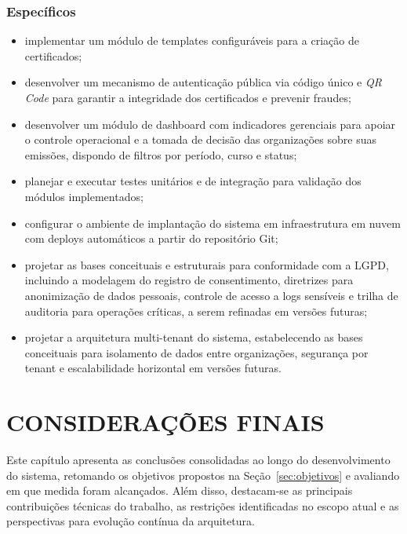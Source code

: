 \documentclass[12pt,openright,oneside,a4paper]{article}
\begin{document}
\subsubsection{Específicos}\label{sec:objetivos-especificos}

\begin{itemize}
    \item implementar um módulo de templates configuráveis para a criação de certificados;
    \item desenvolver um mecanismo de autenticação pública via código único e \textit{QR Code} para garantir a integridade dos certificados e prevenir fraudes;
    \item desenvolver um módulo de dashboard com indicadores gerenciais para apoiar o controle operacional e a tomada de decisão das organizações sobre suas emissões, dispondo de filtros por período, curso e status;
    \item planejar e executar testes unitários e de integração para validação dos módulos implementados;
    \item configurar o ambiente de implantação do sistema em infraestrutura em nuvem com deploys automáticos a partir do repositório Git;
    \item projetar as bases conceituais e estruturais para conformidade com a LGPD, incluindo a modelagem do registro de consentimento, diretrizes para anonimização de dados pessoais, controle de acesso a logs sensíveis e trilha de auditoria para operações críticas, a serem refinadas em versões futuras;
    \item projetar a arquitetura multi-tenant do sistema, estabelecendo as bases conceituais para isolamento de dados entre organizações, segurança por tenant e escalabilidade horizontal em versões futuras.
\end{itemize}







\section{CONSIDERAÇÕES FINAIS}

Este capítulo apresenta as conclusões consolidadas ao longo do desenvolvimento do sistema, retomando os objetivos propostos na Seção~\ref{sec:objetivos} e avaliando em que medida foram alcançados. Além disso, destacam-se as principais contribuições técnicas do trabalho, as restrições identificadas no escopo atual e as perspectivas para evolução contínua da arquitetura.
\end{document}
